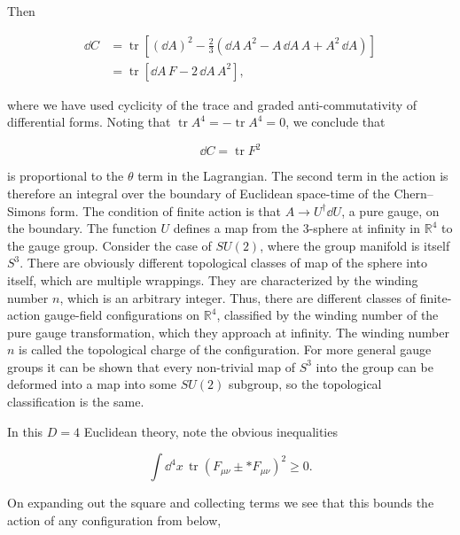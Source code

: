 Then

\[
\begin{aligned}
  \dd C
  &=\operatorname{tr}\left[(\dd A)^2-\frac23
    (\dd A\,A^2-A\,\dd A\,A+A^2\,\dd A)\right]\\
  &=\operatorname{tr}[\dd A\,F-2\,\dd A\,A^2],
\end{aligned}
\]

where we have used cyclicity of the trace and graded anti-commutativity of
differential forms. Noting that $\operatorname{tr}A^4=-\operatorname{tr}A^4=0$,
we conclude that

\begin{equation}
  \dd C=\operatorname{tr}F^2
  \label{eq:10.10}
\end{equation}

is proportional to the $\theta$ term in the Lagrangian. The second term in the
action is therefore an integral over the boundary of Euclidean space-time of the
Chern--Simons form. The condition of finite action is that $A\to U^\dagger\dd U$,
a pure gauge, on the boundary. The function $U$ defines a map from the 3-sphere
at infinity in $\mathbb R^4$ to the gauge group. Consider the case of $SU(2)$,
where the group manifold is itself $S^3$. There are obviously different
topological classes of map of the sphere into itself, which are multiple
wrappings. They are characterized by the winding number $n$, which is an
arbitrary integer. Thus, there are different classes of finite-action gauge-field
configurations on $\mathbb R^4$, classified by the winding number of the pure
gauge transformation, which they approach at infinity. The winding number $n$
is called the topological charge of the configuration. For more general gauge
groups it can be shown that every non-trivial map of $S^3$ into the group can be
deformed into a map into some $SU(2)$ subgroup, so the topological classification
is the same.

In this $D=4$ Euclidean theory, note the obvious inequalities

\begin{equation}
  \int\dd^4x\,\operatorname{tr}(F_{\mu\nu}\pm\ast F_{\mu\nu})^2\geq0.
  \label{eq:10.11}
\end{equation}

On expanding out the square and collecting terms we see that this bounds the
action of any configuration from below,

